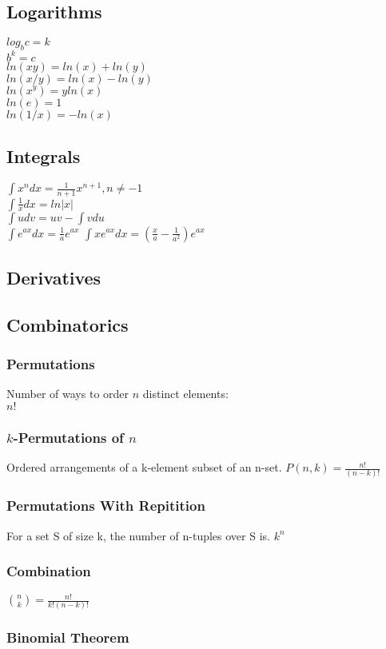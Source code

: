 \subsection*{Logarithms}
$log_bc=k$\\
$b^k=c$\\
$ln(xy)=ln(x)+ln(y)$\\
$ln(x/y)=ln(x)-ln(y)$\\
$ln(x^y)=yln(x)$\\
$ln(e)=1$\\
$ln(1/x)=-ln(x)$

\subsection*{Integrals}
$\int x^ndx = \frac{1}{n+1}x^{n+1},n\neq-1$\\
$\int \frac{1}{x} dx = ln|x|$\\
$\int u dv=uv-\int v du$\\
$\int e^{ax}dx=\frac{1}{a}e^{ax}$
$\int xe^{ax}dx=(\frac{x}{a}-\frac{1}{a^2})e^{ax}$
\subsection*{Derivatives}

\subsection*{Combinatorics}
\subsubsection*{Permutations}
Number of ways to order $n$ distinct elements:\\
$n!$
\subsubsection*{$k$-Permutations of $n$}
Ordered arrangements of a k-element subset of an n-set.
$P(n,k)=\frac{n!}{(n-k)!}$
\subsubsection*{Permutations With Repitition}
For a set S of size k, the number of n-tuples over S is.
$k^n$
\subsubsection*{Combination}
$\binom{n}{k}=\frac{n!}{k!(n-k)!}$
\subsubsection*{Binomial Theorem}



